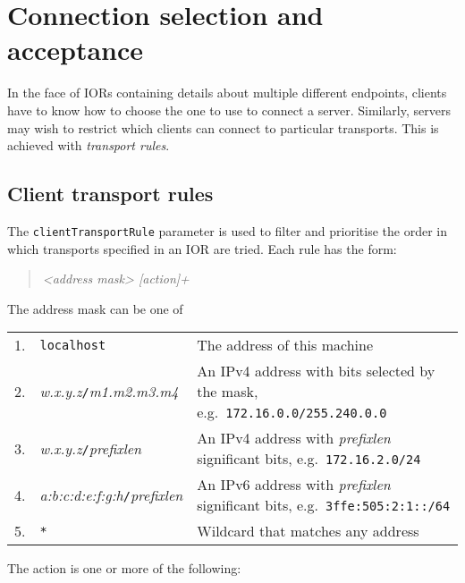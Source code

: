 \documentclass[11pt,twoside,a4paper]{book}
\newcommand{\code}[1]{\texttt{#1}}
\newcommand{\term}[1]{\textit{#1}}
\begin{document}
\section{Connection selection and acceptance}

In the face of IORs containing details about multiple different
endpoints, clients have to know how to choose the one to use to
connect a server. Similarly, servers may wish to restrict which
clients can connect to particular transports. This is achieved with
\term{transport rules}.


\subsection{Client transport rules}
\label{sec:clientRule}

The \code{clientTransportRule} parameter is used to filter and
prioritise the order in which transports specified in an IOR are
tried. Each rule has the form:

\begin{quote}
\textit{<address mask> [action]+}
\end{quote}

\noindent The address mask can be one of

\vspace{\baselineskip}

\begin{tabular}{llp{}}
1. & \code{localhost} & The address of this machine\\

2. & \textit{w.x.y.z}\code{/}\textit{m1.m2.m3.m4} & An IPv4 address
     with bits selected by the mask, e.g.\
     \code{172.16.0.0/255.240.0.0}\\

3. & \textit{w.x.y.z}\code{/}\textit{prefixlen} & An IPv4 address with
     \textit{prefixlen} significant bits, e.g.\
     \code{172.16.2.0/24}\\

4. & \textit{a:b:c:d:e:f:g:h}\code{/}\textit{prefixlen} & An IPv6
     address with \textit{prefixlen} significant bits, e.g.\
     \code{3ffe:505:2:1::/64}\\

5. & \code{*} & Wildcard that matches any address\\
\end{tabular}

\vspace{\baselineskip}

\noindent The action is one or more of the following:
\end{document}
